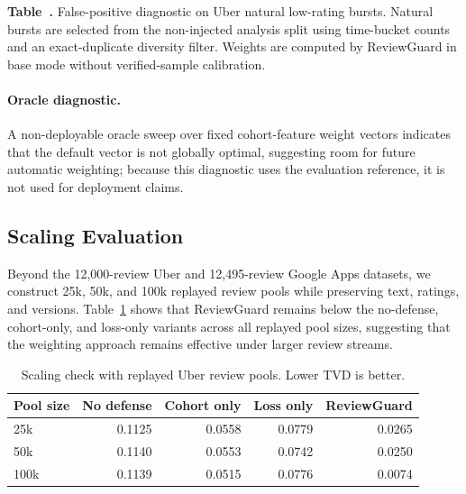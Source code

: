 \documentclass[runningheads]{llncs}
\begin{document}
\begin{center}
\small
{}
\textbf{Table~\thetable.} False-positive diagnostic on Uber natural low-rating bursts. Natural bursts are selected from the non-injected analysis split using time-bucket counts and an exact-duplicate diversity filter. Weights are computed by ReviewGuard in base mode without verified-sample calibration.
\label{tab:natural_burst_false_positive}
\medskip
{}
\end{center}

\paragraph{Oracle diagnostic.}
A non-deployable oracle sweep over fixed cohort-feature weight vectors indicates that the default vector is not globally optimal, suggesting room for future automatic weighting; because this diagnostic uses the evaluation reference, it is not used for deployment claims.



\subsection{Scaling Evaluation}

Beyond the 12,000-review Uber and 12,495-review Google Apps datasets, we construct 25k, 50k, and 100k replayed review pools while preserving text, ratings, and versions. Table~\ref{tab:scale} shows that ReviewGuard remains below the no-defense, cohort-only, and loss-only variants across all replayed pool sizes, suggesting that the weighting approach remains effective under larger review streams.

\begin{table}[htbp]
\centering
\caption{Scaling check with replayed Uber review pools. Lower TVD is better.}
\label{tab:scale}
\begin{tabular}{lrrrr}
\toprule
Pool size & No defense & Cohort only & Loss only & ReviewGuard\\
\midrule
25k & 0.1125 & 0.0558 & 0.0779 & 0.0265\\
50k & 0.1140 & 0.0553 & 0.0742 & 0.0250\\
100k & 0.1139 & 0.0515 & 0.0776 & 0.0074\\
\bottomrule
\end{tabular}
\end{table}
\end{document}
